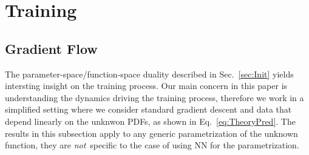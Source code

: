 \documentclass[11pt]{article}
\begin{document}
\section{Training}
\label{sec:Training}

\subsection{Gradient Flow}
\label{sec:GradFlow}

The parameter-space/function-space duality described in Sec.~\ref{sec:Init} yields intersting insight
on the training process. Our main concern in this paper is understanding the dynamics driving the 
training process, therefore we work in a simplified setting where we consider standard gradient descent 
and data that depend linearly on the unknwon PDFs, as shown in Eq.~\eqref{eq:TheoryPred}. The results
in this subsection apply to any generic parametrization of the unknown function, they are {\em not}\ 
specific to the case of using NN for the parametrization. 
\end{document}
